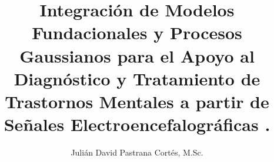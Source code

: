 \usepackage[es-tabla]{babel}

\usepackage{mathptmx} %

\usepackage{setspace}
\singlespacing

\usepackage[margin=1in]{geometry}


\usepackage{hyperref}
\usepackage{parskip}
\usepackage[capitalise, noabbrev]{cleveref}



\title{
	\textbf{
		Integración de Modelos Fundacionales y Procesos Gaussianos para el Apoyo al Diagnóstico y Tratamiento de Trastornos Mentales a partir de Señales Electroencefalográficas .
	}
	}
\author{
	Julián David Pastrana Cortés, M.Sc.
	}


\date{}
